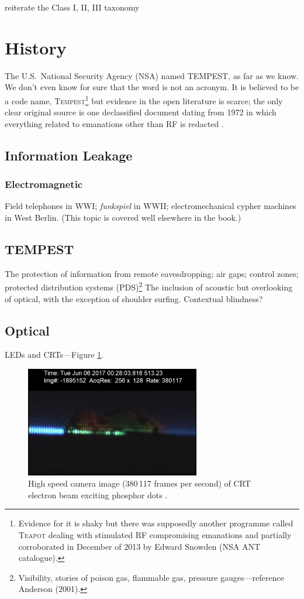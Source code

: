 \documentclass[a4paper,twoside]{book}
\begin{document}
reiterate the Class I, II, III taxonomy

\section{History}
The U.S.\ National Security Agency (NSA) named TEMPEST, as far as we know. We
don't even know for sure that the word is not an acronym. It is believed to
be a code name, \textsc{Tempest}\footnote{Evidence for it is shaky but there
was supposedly another programme called \textsc{Teapot} dealing with
stimulated RF compromising emanations \cite[p.~539]{Anderson2008a} and
partially corroborated in December of 2013 by Edward Snowden (NSA ANT
catalogue).} but evidence in the open literature is scarce; the only clear
original source is one declassified document dating from 1972 in which
everything related to emanations other than RF is redacted
\cite{NSAtempest2007}.
\subsection{Information Leakage}
\subsubsection{Electromagnetic}
Field telephones in WWI; {\it funkspiel} in WWII; electromechanical cypher
machines in West Berlin. (This topic is covered well elsewhere in the book.)
\subsection{TEMPEST}
The protection of information from remote eavesdropping; air gaps; control
zones; protected distribution systems (PDS)\footnote{Visibility, stories of
poison gas, flammable gas, pressure gauges---reference Anderson (2001).} The
inclusion of acoustic but overlooking of optical, with the exception of
shoulder surfing. Contextual blindness?
\subsection{Optical}
LEDs and CRTs---Figure \ref{figure:slow-mo_guys_crt}.
\begin{figure}[ht]
  \centering
  \includegraphics[width=3in]{slow-mo_guys_crt.png}
  \caption{High speed camera image (380\,117 frames per second) of CRT electron
    beam exciting phosphor dots \protect\cite{Free2018}.}
  \label{figure:slow-mo_guys_crt}
\end{figure}
\end{document}
